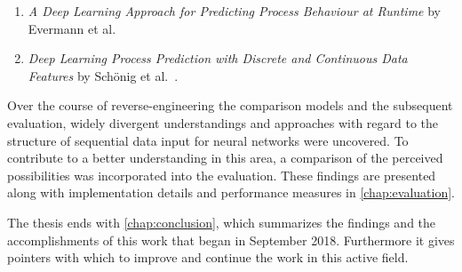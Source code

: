 \begin{enumerate}
    \item \textit{A Deep Learning Approach for Predicting Process Behaviour at Runtime} by Evermann et al.~\cite{evermann2016} \item\textit{Deep Learning Process Prediction with Discrete and Continuous Data Features} by Schönig et al.~\cite{schoenig2018}.
\end{enumerate}

Over the course of reverse-engineering the comparison models and the subsequent evaluation, widely divergent understandings and approaches with regard to the structure of sequential data input for neural networks were uncovered. To contribute to a better understanding in this area, a comparison of the perceived possibilities was incorporated into the evaluation. These findings are presented along with implementation details and performance measures in \autoref{chap:evaluation}.

The thesis ends with \autoref{chap:conclusion}, which summarizes the findings and the accomplishments of this work that began in September 2018. Furthermore it gives pointers with which to improve and continue the work in this active field.
